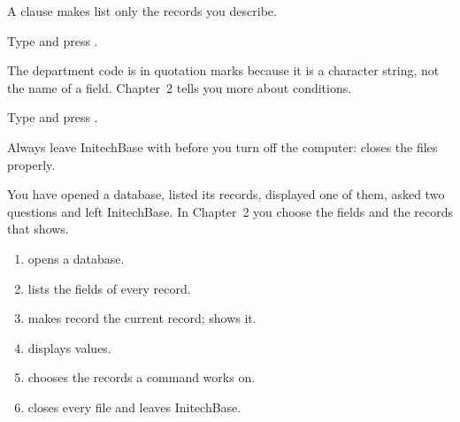 A  clause makes  list only the records you describe.
\begin{Steps}[resume]
\item Type  and press
.
\end{Steps}
The department code is in quotation marks because it is a character string,
not the name of a field.  Chapter~2 tells you more about conditions.

\begin{Steps}[resume]
\item Type  and press .
\end{Steps}
Always leave InitechBase with  before you turn off the computer:
 closes the files properly.

You have opened a database, listed its records, displayed one of them, asked
two questions and left InitechBase.  In Chapter~2 you choose the fields and
the records that  shows.

\begin{enumerate}
\item {}  opens a database.
\item {}  lists the fields of every record.
\item {}  makes record  the current record;  shows
  it.
\item {}  displays values.
\item {}  chooses the records a command works on.
\item {} closes every file and leaves InitechBase.
\end{enumerate}
